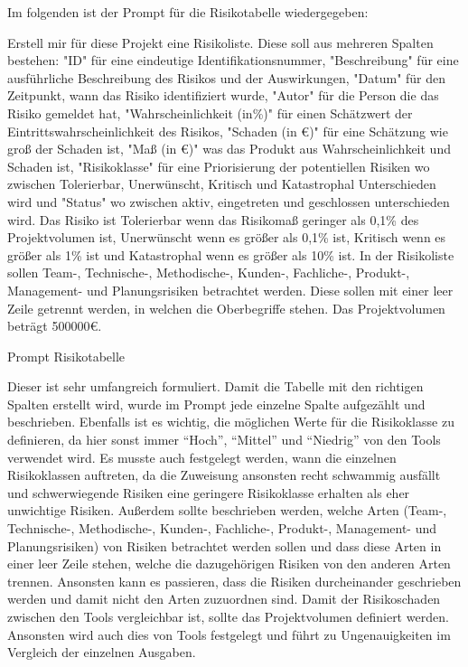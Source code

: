 Im folgenden ist der Prompt für die Risikotabelle wiedergegeben:

\begin{prompt}[H]
    \begin{tcolorbox}[colback=gray!20, colframe=gray!20, boxrule=0pt, sharp corners] 
        Erstell mir für diese Projekt eine Risikoliste. Diese soll aus mehreren Spalten bestehen: "ID" für eine 
        eindeutige Identifikationsnummer, "Beschreibung" für eine ausführliche Beschreibung des Risikos und der 
        Auswirkungen, "Datum" für den Zeitpunkt, wann das Risiko identifiziert wurde, "Autor" für die Person die 
        das Risiko gemeldet hat, "Wahrscheinlichkeit (in\%)" für einen Schätzwert der Eintrittswahrscheinlichkeit 
        des Risikos, "Schaden (in €)" für eine Schätzung wie groß der Schaden ist, "Maß (in €)" was das Produkt aus 
        Wahrscheinlichkeit und Schaden ist, "Risikoklasse" für eine Priorisierung der potentiellen Risiken wo 
        zwischen Tolerierbar, Unerwünscht, Kritisch und Katastrophal Unterschieden wird und "Status" wo zwischen 
        aktiv, eingetreten und geschlossen unterschieden wird. Das Risiko ist Tolerierbar wenn das Risikomaß geringer 
        als 0,1\% des Projektvolumen ist, Unerwünscht wenn es größer als 0,1\% ist, Kritisch wenn es größer als 1\% 
        ist und Katastrophal wenn es größer als 10\% ist. In der Risikoliste sollen Team-, Technische-, Methodische-, 
        Kunden-, Fachliche-, Produkt-, Management- und Planungsrisiken betrachtet werden. Diese sollen mit einer 
        leer Zeile getrennt werden, in welchen die Oberbegriffe stehen. Das Projektvolumen beträgt 500000€.
        \vfill
    \end{tcolorbox}
    \caption{Prompt Risikotabelle}
    \label{Prompt Risikotabelle}
\end{prompt}

Dieser ist sehr umfangreich formuliert. Damit die Tabelle mit den richtigen Spalten erstellt wird, wurde im Prompt jede
einzelne Spalte aufgezählt und beschrieben. Ebenfalls ist es wichtig, die möglichen Werte für die Risikoklasse zu 
definieren, da hier sonst immer ``Hoch'', ``Mittel'' und ``Niedrig'' von den Tools verwendet wird. Es musste auch 
festgelegt werden, wann die einzelnen Risikoklassen auftreten, da die Zuweisung ansonsten recht schwammig ausfällt und
schwerwiegende Risiken eine geringere Risikoklasse erhalten als eher unwichtige Risiken. Außerdem sollte beschrieben 
werden, welche Arten (Team-, Technische-, Methodische-, Kunden-, Fachliche-, Produkt-, Management- und Planungsrisiken) 
von Risiken betrachtet werden sollen und dass diese Arten in einer leer Zeile stehen, welche die dazugehörigen Risiken von 
den anderen Arten trennen. Ansonsten kann es passieren, dass die Risiken durcheinander geschrieben werden und damit nicht 
den Arten zuzuordnen sind. Damit der Risikoschaden zwischen den Tools vergleichbar ist, sollte das Projektvolumen definiert 
werden. Ansonsten wird auch dies von Tools festgelegt und führt zu Ungenauigkeiten im Vergleich der einzelnen Ausgaben.

